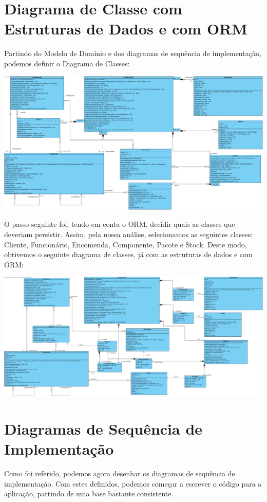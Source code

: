 \documentclass[11pt]{article} %
\begin{document}
\section{Diagrama de Classe com Estruturas de Dados e com ORM}
Partindo do Modelo de Domínio e dos diagramas de sequência de implementação, podemos definir o Diagrama de Classes:
\begin{center}
 	\includegraphics[width=6in]{Classes.png}
\end{center}

O passo seguinte foi, tendo em conta o ORM, decidir quais as classes que deveriam persistir. Assim, pela nossa análise, selecionamos as seguintes classes: Cliente, Funcionário, Encomenda, Componente, Pacote e Stock. Deste modo, obtivemos o seguinte diagrama de classes, já com as estruturas de dados e com ORM:
\begin{center}
 	\includegraphics[width=6in]{ClassesDAO.png}
\end{center}


\section{Diagramas de Sequência de Implementação}
Como foi referido, podemos agora desenhar os diagramas de sequência de implementação. Com estes definidos, podemos começar a escrever o código para a aplicação, partindo de uma base bastante consistente.
\end{document}
